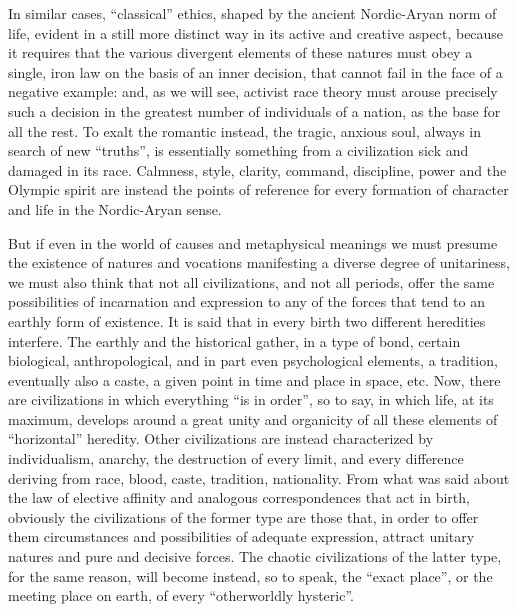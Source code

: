 In similar cases, ``classical'' ethics, shaped by the ancient Nordic-Aryan norm of life, evident in a still more distinct way in its active and creative aspect, because it requires that the various divergent elements of these natures must obey a single, iron law on the basis of an inner decision, that cannot fail in the face of a negative example: and, as we will see, activist race theory must arouse precisely such a decision in the greatest number of individuals of a nation, as the base for all the rest. To exalt the romantic instead, the tragic, anxious soul, always in search of new ``truths'', is essentially something from a civilization sick and damaged in its race. Calmness, style, clarity, command, discipline, power and the Olympic spirit are instead the points of reference for every formation of character and life in the Nordic-Aryan sense.

But if even in the world of causes and metaphysical meanings we must presume the existence of natures and vocations manifesting a diverse degree of unitariness, we must also think that not all civilizations, and not all periods, offer the same possibilities of incarnation and expression to any of the forces that tend to an earthly form of existence. It is said that in every birth two different heredities interfere. The earthly and the historical gather, in a type of bond, certain biological, anthropological, and in part even psychological elements, a tradition, eventually also a caste, a given point in time and place in space, etc. Now, there are civilizations in which everything ``is in order'', so to say, in which life, at its maximum, develops around a great unity and organicity of all these elements of ``horizontal'' heredity. Other civilizations are instead characterized by individualism, anarchy, the destruction of every limit, and every difference deriving from race, blood, caste, tradition, nationality. From what was said about the law of elective affinity and analogous correspondences that act in birth, obviously the civilizations of the former type are those that, in order to offer them circumstances and possibilities of adequate expression, attract unitary natures and pure and decisive forces. The chaotic civilizations of the latter type, for the same reason, will become instead, so to speak, the ``exact place'', or the meeting place on earth, of every ``otherworldly hysteric''.

